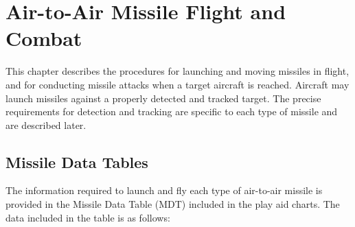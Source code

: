 \section{Air-to-Air Missile Flight and Combat}

This chapter describes the procedures for launching and moving missiles in flight, and for conducting missile attacks when a target aircraft is reached. Aircraft may launch missiles against a properly detected and tracked target. The precise requirements for detection and tracking are specific to each type of missile and are described later.

\subsection{Missile Data Tables}

The information required to launch and fly each type of air-to-air missile is provided in the Missile Data Table (MDT) included in the play aid charts. The data included in the table is as follows:

